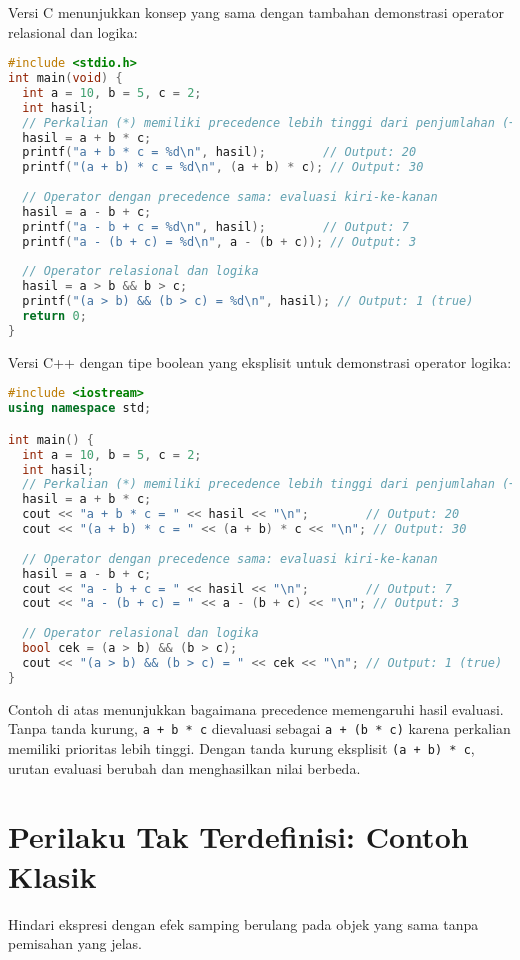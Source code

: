 \documentclass[../main.tex]{subfiles}
\begin{document}
Versi C menunjukkan konsep yang sama dengan tambahan demonstrasi operator relasional dan logika:

\begin{lstlisting}[language=C, caption={Precedence operator di C}]
#include <stdio.h>
int main(void) {
  int a = 10, b = 5, c = 2;
  int hasil;
  // Perkalian (*) memiliki precedence lebih tinggi dari penjumlahan (+)
  hasil = a + b * c;
  printf("a + b * c = %d\n", hasil);        // Output: 20
  printf("(a + b) * c = %d\n", (a + b) * c); // Output: 30
  
  // Operator dengan precedence sama: evaluasi kiri-ke-kanan
  hasil = a - b + c;
  printf("a - b + c = %d\n", hasil);        // Output: 7
  printf("a - (b + c) = %d\n", a - (b + c)); // Output: 3
  
  // Operator relasional dan logika
  hasil = a > b && b > c;
  printf("(a > b) && (b > c) = %d\n", hasil); // Output: 1 (true)
  return 0;
}
\end{lstlisting}

Versi C++ dengan tipe boolean yang eksplisit untuk demonstrasi operator logika:

\begin{lstlisting}[language=C++, caption={Precedence operator di C++}]
#include <iostream>
using namespace std;

int main() {
  int a = 10, b = 5, c = 2;
  int hasil;
  // Perkalian (*) memiliki precedence lebih tinggi dari penjumlahan (+)
  hasil = a + b * c;
  cout << "a + b * c = " << hasil << "\n";        // Output: 20
  cout << "(a + b) * c = " << (a + b) * c << "\n"; // Output: 30
  
  // Operator dengan precedence sama: evaluasi kiri-ke-kanan
  hasil = a - b + c;
  cout << "a - b + c = " << hasil << "\n";        // Output: 7
  cout << "a - (b + c) = " << a - (b + c) << "\n"; // Output: 3
  
  // Operator relasional dan logika
  bool cek = (a > b) && (b > c);
  cout << "(a > b) && (b > c) = " << cek << "\n"; // Output: 1 (true)
}
\end{lstlisting}

Contoh di atas menunjukkan bagaimana precedence memengaruhi hasil evaluasi. Tanpa tanda kurung, \texttt{a + b * c} dievaluasi sebagai \texttt{a + (b * c)} karena perkalian memiliki prioritas lebih tinggi. Dengan tanda kurung eksplisit \texttt{(a + b) * c}, urutan evaluasi berubah dan menghasilkan nilai berbeda.

\section{Perilaku Tak Terdefinisi: Contoh Klasik}
Hindari ekspresi dengan efek samping berulang pada objek yang sama tanpa pemisahan yang jelas.
\end{document}
